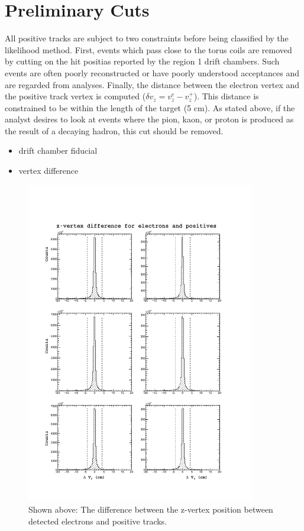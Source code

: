 \section{Preliminary Cuts}


All positive tracks are subject to two constraints before being classified by the likelihood method.  First, events which pass close to the torus coils are removed by cutting on the hit positias reported by the region 1 drift chambers.  Such events are often poorly reconstructed or have poorly understood acceptances and are regarded from analyses.  Finally, the distance between the electron vertex and the positive track vertex is computed ($\delta v_{z} = v_{z}^{e} - v_{z}^{+}$).  This distance is constrained to be within the length of the target (5 cm).  As stated above, if the analyst desires to look at events where the pion, kaon, or proton is produced as the result of a decaying hadron, this cut should be removed.  

\begin{itemize}
  \item drift chamber fiducial 
  \item vertex difference 
\end{itemize}

\begin{figure}
  \begin{center}
    \includegraphics[width=10cm]{image/dvz.pdf}
    \caption{Shown above: The difference between the z-vertex position between detected electrons and positive tracks.}
  \end{center}
\end{figure}

